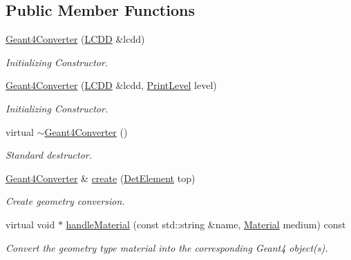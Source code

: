 \subsection*{Public Member Functions}
\begin{DoxyCompactItemize}
\item 
\hyperlink{class_d_d4hep_1_1_simulation_1_1_geant4_converter_aaed2b0700c7bdbc747a7c5cf0b0e4b0e}{Geant4Converter} (\hyperlink{class_d_d4hep_1_1_geometry_1_1_l_c_d_d}{LCDD} \&lcdd)
\begin{DoxyCompactList}\small\item\em Initializing Constructor. \item\end{DoxyCompactList}\item 
\hyperlink{class_d_d4hep_1_1_simulation_1_1_geant4_converter_a102d0182df67257e795fde27d685b830}{Geant4Converter} (\hyperlink{class_d_d4hep_1_1_geometry_1_1_l_c_d_d}{LCDD} \&lcdd, \hyperlink{namespace_d_d4hep_a5b5a64d56252469451f2020a27d57d42}{PrintLevel} level)
\begin{DoxyCompactList}\small\item\em Initializing Constructor. \item\end{DoxyCompactList}\item 
virtual \hyperlink{class_d_d4hep_1_1_simulation_1_1_geant4_converter_a7f6a35aaa5aa5609700e21a061c142e3}{$\sim$Geant4Converter} ()
\begin{DoxyCompactList}\small\item\em Standard destructor. \item\end{DoxyCompactList}\item 
\hyperlink{class_d_d4hep_1_1_simulation_1_1_geant4_converter}{Geant4Converter} \& \hyperlink{class_d_d4hep_1_1_simulation_1_1_geant4_converter_ab43bb402a64c6647e47f4706097f8990}{create} (\hyperlink{class_d_d4hep_1_1_geometry_1_1_det_element}{DetElement} top)
\begin{DoxyCompactList}\small\item\em Create geometry conversion. \item\end{DoxyCompactList}\item 
virtual void $\ast$ \hyperlink{class_d_d4hep_1_1_simulation_1_1_geant4_converter_ac62685399e2c393c8d605d664353731c}{handleMaterial} (const std::string \&name, \hyperlink{class_d_d4hep_1_1_geometry_1_1_material}{Material} medium) const 
\begin{DoxyCompactList}\small\item\em Convert the geometry type material into the corresponding Geant4 object(s). \item\end{DoxyCompactList}\item 

\end{DoxyCompactItemize}
